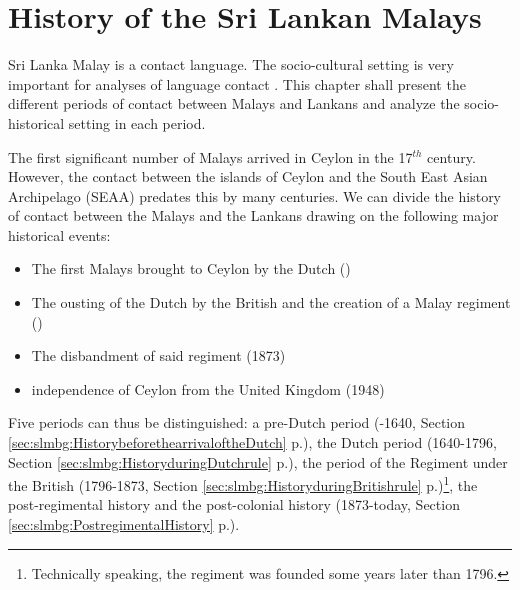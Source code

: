 \chapter{History of the Sri Lankan Malays}

 
Sri Lanka Malay is a contact language. The socio-cultural setting is very important for analyses of language contact \citep{Weinreich1953, ThomasonEtAl1988}. This chapter shall present the
different periods of contact between Malays and Lankans and
analyze the socio-historical setting in each period.

The first significant number of Malays arrived in
Ceylon in the 17$^{th}$ century. However, the contact between the
islands of Ceylon and the South East Asian Archipelago (SEAA)
predates this by many centuries. We can divide the history of
contact between the Malays and the Lankans drawing on the
following major historical events:

\begin{itemize}
    \item The first Malays brought to Ceylon by the Dutch ()
    \item The ousting of the Dutch by the British and the creation of a Malay regiment ()
    \item The disbandment of said regiment (1873)
    \item independence of Ceylon from the United Kingdom (1948)
\end{itemize}

Five periods can thus be distinguished:
a pre-Dutch period (-1640, Section \ref{sec:slmbg:HistorybeforethearrivaloftheDutch} p.\pageref{sec:slmbg:HistorybeforethearrivaloftheDutch}),
the Dutch period (1640-1796, Section \ref{sec:slmbg:HistoryduringDutchrule} p.\pageref{sec:slmbg:HistoryduringDutchrule}),
the period of the Regiment under the British (1796-1873, Section \ref{sec:slmbg:HistoryduringBritishrule} p.\pageref{sec:slmbg:HistoryduringBritishrule})\footnote{Technically speaking, the regiment was founded some years later than 1796.},
the post-regimental history and the post-colonial history (1873-today, Section \ref{sec:slmbg:PostregimentalHistory} p.\pageref{sec:slmbg:PostregimentalHistory}).

